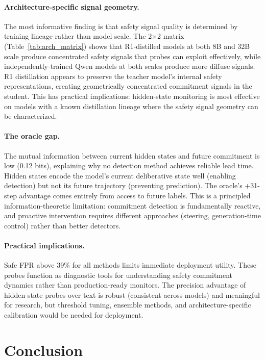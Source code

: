 \documentclass[11pt,a4paper]{article}
\begin{document}
\paragraph{Architecture-specific signal geometry.} The most informative finding is that safety signal quality is determined by training lineage rather than model scale. The 2$\times$2 matrix (Table~\ref{tab:arch_matrix}) shows that R1-distilled models at both 8B and 32B scale produce concentrated safety signals that probes can exploit effectively, while independently-trained Qwen models at both scales produce more diffuse signals. R1 distillation appears to preserve the teacher model's internal safety representations, creating geometrically concentrated commitment signals in the student. This has practical implications: hidden-state monitoring is most effective on models with a known distillation lineage where the safety signal geometry can be characterized.

\paragraph{The oracle gap.} The mutual information between current hidden states and future commitment is low (0.12 bits), explaining why no detection method achieves reliable lead time. Hidden states encode the model's current deliberative state well (enabling detection) but not its future trajectory (preventing prediction). The oracle's +31-step advantage comes entirely from access to future labels. This is a principled information-theoretic limitation: commitment detection is fundamentally reactive, and proactive intervention requires different approaches (steering, generation-time control) rather than better detectors.

\paragraph{Practical implications.} Safe FPR above 39\% for all methods limits immediate deployment utility. These probes function as diagnostic tools for understanding safety commitment dynamics rather than production-ready monitors. The precision advantage of hidden-state probes over text is robust (consistent across models) and meaningful for research, but threshold tuning, ensemble methods, and architecture-specific calibration would be needed for deployment.

\section{Conclusion}
\end{document}
